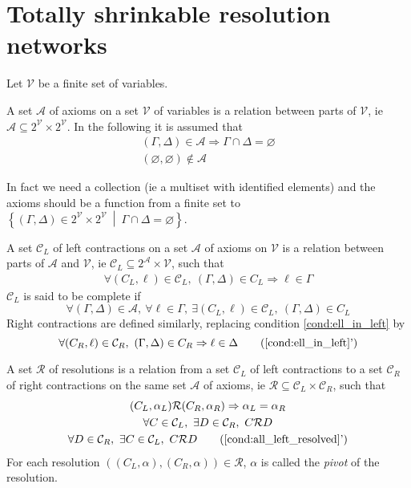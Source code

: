 \documentclass{article}
\newenvironment{comment}{\color{teal}}{}
\newcommand{\parts}[1]{2^{#1}}
\newcommand{\ens}[2]{\left\{ #1 ~ \middle| ~ #2 \right\}}
\newcommand{\varSet}{\mathcal{V}}
\newcommand{\axiomSet}{\mathcal{A}}
\newcommand{\conSet}{\mathcal{C}}
\newcommand{\resoSet}{\mathcal{R}}
\begin{document}
\section{Totally shrinkable resolution networks}

Let $\varSet$ be a finite set of variables.

A set $\axiomSet$ of axioms on a set $\varSet$ of variables is a relation between parts of $\varSet$,
ie $\axiomSet \subseteq \parts{\varSet} \times \parts{\varSet}$. In the following it is assumed that
\begin{gather}
  \left(\Gamma, \Delta \right) \in \axiomSet \Rightarrow \Gamma \cap \Delta = \varnothing \\
  (\varnothing, \varnothing) \notin \axiomSet
\end{gather}

\begin{comment}In fact we need a collection (ie a multiset with identified elements) and the axioms
  should be a function from a finite set to $\ens{(\Gamma,\Delta) \in \parts{\varSet} \times
  \parts{\varSet}}{\Gamma \cap \Delta = \varnothing}$.
\end{comment}

A set $\conSet_L$ of left contractions on a set $\axiomSet$ of axioms on $\varSet$ is a relation
between parts of $\axiomSet$ and $\varSet$, ie $\conSet_L \subseteq \parts{\axiomSet} \times
\varSet$, such that
\begin{gather}
  \forall (C_L,\ell) \in \conSet_L ,~ (\Gamma, \Delta) \in C_L \Rightarrow \ell \in \Gamma
    \label{cond:ell_in_left} %
\end{gather}
$\conSet_L$ is said to be complete if
\begin{equation}
  \forall (\Gamma, \Delta) \in \axiomSet ,~ \forall \ell \in \Gamma ,~
    \exists (C_L, \ell) \in \conSet_L ,~ (\Gamma, \Delta) \in C_L
\end{equation}
Right contractions are defined similarly, replacing condition \eqref{cond:ell_in_left} by
\begin{equation}
  \forall (C_R,\ell) \in \conSet_R ,~ (\Gamma, \Delta) \in C_R \Rightarrow \ell \in \Delta
\tag{\ref{cond:ell_in_left}'}
\end{equation}

A set $\resoSet$ of resolutions is a relation from a set $\conSet_L$ of left contractions to a set
$\conSet_R$ of right contractions on the same set $\axiomSet$ of axioms, ie $\resoSet \subseteq
\conSet_L \times \conSet_R$, such that
\begin{gather}
  (C_L, \alpha_L) \resoSet (C_R, \alpha_R) \Rightarrow \alpha_L = \alpha_R \\
  \forall C \in \conSet_L ,~ \exists D \in \conSet_R ,~ C \resoSet D
    \label{cond:all_left_resolved} \\
  \forall D \in \conSet_R ,~ \exists C \in \conSet_L ,~ C \resoSet D
    \tag{\ref{cond:all_left_resolved}'}
\end{gather}
For each resolution $((C_L,\alpha),(C_R,\alpha)) \in \resoSet$, $\alpha$ is called the \emph{pivot}
of the resolution.
\end{document}
